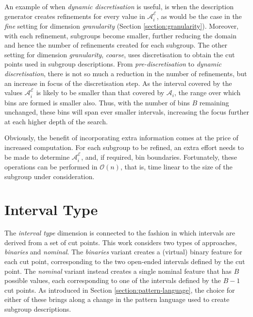 \documentclass[smallextended]{svjour3}
\newcommand{\extension}[1]{\mathcal{E}_{#1}}
\newcommand{\dimension}{\emph}
\newcommand{\parameter}{\emph}
\newcommand{\dyndis}{\parameter{dynamic discretisation}}
\newcommand{\predis}{\parameter{pre-discretisation}}
\newcommand{\binaries}{\parameter{binaries}}
\newcommand{\nominal}{\parameter{nominal}}
\newcommand{\fine}{\parameter{fine}}
\newcommand{\coarse}{\parameter{coarse}}
\begin{document}
An example of when \dyndis{} is useful, is when the description generator creates refinements for every value in $\mathcal{A}_i^{\extension{}}$, as would be the case in the \fine{} setting for dimension \dimension{granularity} (Section \ref{section:granularity}).
Moreover, with each refinement, subgroups become smaller, further reducing the domain and hence the number of refinements created for each subgroup.
The other setting for dimension \dimension{granularity}, \coarse{}, uses discretisation to obtain the cut points used in subgroup descriptions.
From \predis{} to \dyndis{}, there is not so much a reduction in the number of refinements, but an increase in focus of the discretisation step.
As the interval covered by the values $\mathcal{A}_i^{\extension{}}$ is likely to be smaller than that covered by $\mathcal{A}_i$, the range over which bins are formed is smaller also.
Thus, with the number of bins $B$ remaining unchanged, these bins will span ever smaller intervals, increasing the focus further at each higher depth of the search.

Obviously, the benefit of incorporating extra information comes at the price of increased computation.
For each subgroup to be refined, an extra effort needs to be made to determine $\mathcal{A}_i^{\extension{}}$, and, if required, bin boundaries.
Fortunately, these operations can be performed in $\mathcal{O}(n)$, that is, time linear to the size of the subgroup under consideration.





\section{Interval Type}
\label{section:interval-type}

The \dimension{interval type} dimension is connected to the fashion in which intervals are derived from a set of cut points.
This work considers two types of approaches, \binaries{} and \nominal{}.
The \binaries{} variant creates a (virtual) binary feature for each cut point, corresponding to the two open-ended intervals defined by the cut point.
The \nominal{} variant instead creates a single nominal feature that has $B$ possible values, each corresponding to one of the intervals defined by the $B{-}1$ cut points.
As introduced in Section \ref{section:pattern-language}, the choice for either of these brings along a change in the pattern language used to create subgroup descriptions.
\end{document}
